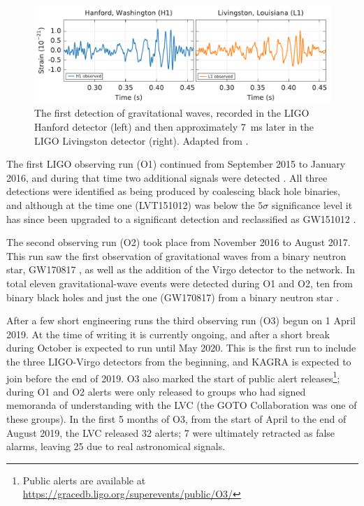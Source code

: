 \begin{colsection}
\begin{colsection}
\begin{figure}[t]
    \begin{center}
        \includegraphics[width=\linewidth]{images/chirp.pdf}
    \end{center}
    \caption[The first detection of gravitational waves]{
        The first detection of gravitational waves, recorded in the LIGO Hanford detector (left) and then approximately \SI{7}{\milli\second} later in the LIGO Livingston detector (right). Adapted from \citet{GW150914}.
        }\label{fig:chirp}
\end{figure}

The first LIGO observing run (O1)  continued from September 2015 to January 2016, and during that time two additional signals were detected \citep{LIGO_O1}. All three detections were identified as being produced by coalescing black hole binaries, and although at the time one (LVT151012) was below the $5\sigma$ significance level it has since been upgraded to a significant detection and reclassified as GW151012 \citep{GW_catalog}.

The second observing run (O2)  took place from November 2016 to August 2017. This run saw the first observation of gravitational waves from a binary neutron star, GW170817 \citep{GW170817}, as well as the addition of the Virgo detector to the network. In total eleven gravitational-wave events were detected during O1 and O2, ten from binary black holes and just the one (GW170817) from a binary neutron star \citep{GW_catalog}.

After a few short engineering runs the third observing run (O3)  begun on 1 April 2019. At the time of writing it is currently ongoing, and after a short break during October is expected to run until May 2020. This is the first run to include the three LIGO-Virgo detectors from the beginning, and KAGRA is expected to join before the end of 2019. O3 also marked the start of public alert releases\footnote{Public alerts are available at \url{https://gracedb.ligo.org/superevents/public/O3/}}; during O1 and O2 alerts were only released to groups who had signed memoranda of understanding with the LVC (the GOTO Collaboration was one of these groups). In the first 5 months of O3, from the start of April to the end of August 2019, the LVC released 32 alerts; 7 were ultimately retracted as false alarms, leaving 25 due to real astronomical signals.


\end{colsection}
\end{colsection}
